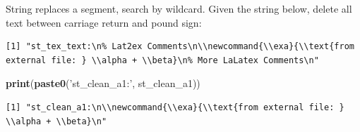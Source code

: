 \documentclass[
]{book}
\newenvironment{Shaded}{\begin{snugshade}}{\end{snugshade}}
\newcommand{\CharTok}[1]{\textcolor[rgb]{0.31,0.60,0.02}{#1}}
\newcommand{\KeywordTok}[1]{\textcolor[rgb]{0.13,0.29,0.53}{\textbf{#1}}}
\newcommand{\NormalTok}[1]{#1}
\newcommand{\StringTok}[1]{\textcolor[rgb]{0.31,0.60,0.02}{#1}}
\begin{document}
String replaces a segment, search by wildcard. Given the string below, delete all text between carriage return and pound sign:

\begin{Shaded}
\end{Shaded}

\begin{verbatim}
[1] "st_tex_text:\n% Lat2ex Comments\n\\newcommand{\\exa}{\\text{from external file: } \\alpha + \\beta}\n% More LaLatex Comments\n"
\end{verbatim}

\begin{Shaded}
\begin{Highlighting}[]
\KeywordTok{print}\NormalTok{(}\KeywordTok{paste0}\NormalTok{(}\StringTok{'st_clean_a1:'}\NormalTok{, st_clean_a1))}
\end{Highlighting}
\end{Shaded}

\begin{verbatim}
[1] "st_clean_a1:\n\\newcommand{\\exa}{\\text{from external file: } \\alpha + \\beta}\n"
\end{verbatim}
\end{document}

